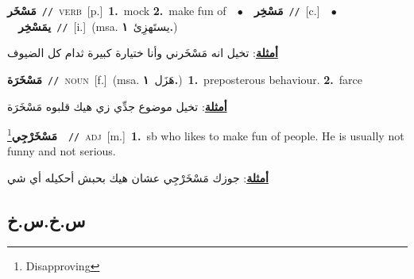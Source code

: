 \documentclass[10pt,a4paper,twoside]{article} %
\begin{document}
\begin{multicols}{2}
{\setlength\topsep{0pt}\textbf{\foreignlanguage{arabic}{مَسْخَر}}\ {\color{gray}\texttt{//}\color{black}}\ \textsc{verb}\ [p.]\ \textbf{1.}~mock  \textbf{2.}~make fun of\ \ $\bullet$\ \ \setlength\topsep{0pt}\textbf{\foreignlanguage{arabic}{مَسْخِر}}\ {\color{gray}\texttt{//}\color{black}}\ [c.]\ \ $\bullet$\ \ \setlength\topsep{0pt}\textbf{\foreignlanguage{arabic}{يمَسْخِر}}\ {\color{gray}\texttt{//}\color{black}}\ [i.]\ \color{gray}(msa. \foreignlanguage{arabic}{يستَهزِئ}~\foreignlanguage{arabic}{\textbf{١.}})\color{black}\  \begin{flushright}\color{gray}\foreignlanguage{arabic}{\textbf{\underline{\foreignlanguage{arabic}{أمثلة}}}: تخيل انه مَسْخَرني وأنا ختيارة كبيرة ثدام كل الضيوف}\end{flushright}\color{black}} \vspace{2mm}

{\setlength\topsep{0pt}\textbf{\foreignlanguage{arabic}{مَسْخَرَة}}\ {\color{gray}\texttt{//}\color{black}}\ \textsc{noun}\ [f.]\ \color{gray}(msa. \foreignlanguage{arabic}{هَزَل}~\foreignlanguage{arabic}{\textbf{١.}})\color{black}\ \textbf{1.}~preposterous behaviour.  \textbf{2.}~farce\  \begin{flushright}\color{gray}\foreignlanguage{arabic}{\textbf{\underline{\foreignlanguage{arabic}{أمثلة}}}: تخيل موضوع جدِّي زي هيك قلبوه مَسْخَرَة}\end{flushright}\color{black}} \vspace{2mm}

{\setlength\topsep{0pt}\textbf{\foreignlanguage{arabic}{مَسْخَرْجِي}}\footnote{Disapproving}\ \ {\color{gray}\texttt{//}\color{black}}\ \textsc{adj}\ [m.]\ \textbf{1.}~sb who likes to make fun of people. He is usually not funny and not serious.\  \begin{flushright}\color{gray}\foreignlanguage{arabic}{\textbf{\underline{\foreignlanguage{arabic}{أمثلة}}}: جوزك مَسْخَرْجِي عشان هيك بحبش أحكيله أي شي}\end{flushright}\color{black}} \vspace{2mm}

\vspace{-3mm}
\subsection*{\color{blue}\foreignlanguage{arabic}{س.خ.س.خ}\color{blue}{}} 


\end{multicols}
\end{document}
